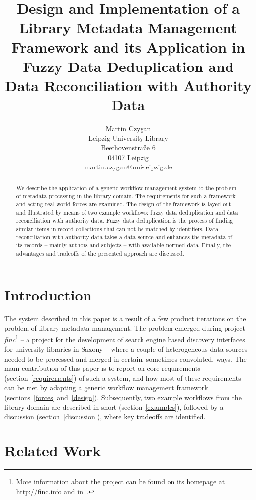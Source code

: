 \documentclass[english]{lni}
\author{
    Martin Czygan \\
    Leipzig University Library \\
    Beethovenstra\ss{}e 6 \\
    04107 Leipzig \\
    martin.czygan@uni-leipzig.de
}
\title{Design and Implementation of a Library Metadata Management Framework and its Application
       in Fuzzy Data Deduplication and Data Reconciliation with Authority Data}
\begin{document}
\maketitle

\begin{abstract}
We describe the application of a generic workflow management
system to the problem of metadata processing in the library domain. The
requirements for such a framework and acting real-world forces
are examined. The design of the framework is layed out and illustrated by means of two example workflows: fuzzy data deduplication and data reconciliation
with authority data. Fuzzy data deduplication is the process of finding
similar items in record collections that can not be matched by identifiers. Data reconciliation with authority
data takes a data source and enhances the metadata of its records -- mainly authors and subjects -- with available
normed data. Finally, the advantages and tradeoffs of the presented approach are discussed.

\end{abstract}

\section{Introduction}

The system described in this paper is a result of a few
product iterations on the problem of library metadata management. The problem
emerged during project \emph{finc}\footnote{More information about the project can
be found on its homepage at \url{http://finc.info} and in~\cite{GBV0007757838}.} -- a project for the development of search engine based discovery interfaces for university libraries in Saxony -- where a couple of heterogeneous data sources needed to be processed and merged in certain, sometimes convoluted, ways. The main contribution of this paper is to report on core requirements (section~\ref{requirements}) of such a system, and how most of these requirements can be met by adapting a generic workflow management framework (sections~\ref{forces} and~\ref{design}). Subsequently, two example workflows from the library domain are described in short (section~\ref{examples}), followed by a discussion (section~\ref{discussion}), where key tradeoffs are identified.

\section{Related Work}
\end{document}
